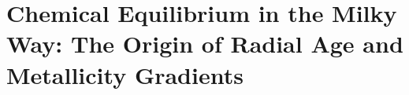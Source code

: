 \documentclass[main.tex]{subfiles}
\begin{document}
\chapter{Chemical Equilibrium in the Milky Way: The Origin of Radial Age
and Metallicity Gradients}
\label{outflows}




\end{document}
